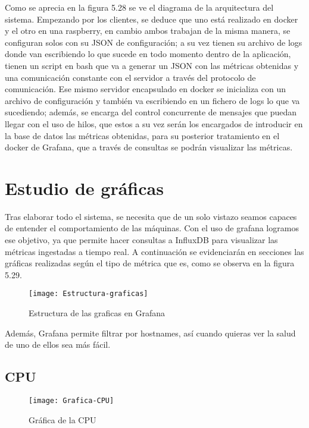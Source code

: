 \documentclass[ spanish, a4paper, 12pt, oneside]{report}
\begin{document}
Como se aprecia en la figura 5.28 se ve el diagrama de la arquitectura del sistema. Empezando por los clientes, se deduce que uno está realizado en docker y el otro en una raspberry, en cambio ambos trabajan de la misma manera, se configuran solos con su JSON de configuración; a su vez tienen su archivo de logs donde van escribiendo lo que 
sucede en todo momento dentro de la aplicación, tienen un script en bash que va a generar un JSON con las métricas obtenidas y una comunicación constante con el servidor a través del protocolo de comunicación. Ese mismo servidor encapsulado en docker se inicializa con un archivo de configuración y también va escribiendo en un fichero de logs lo que va sucediendo; además, 
se encarga del control concurrente de mensajes que puedan llegar con el uso de hilos, que estos a su vez serán los encargados de introducir en la base de datos las métricas obtenidas, para su posterior tratamiento en el docker de Grafana, que a través de consultas se podrán visualizar las métricas. \\
\newpage
\section{Estudio de gráficas}

Tras elaborar todo el sistema, se necesita que de un solo vistazo seamos capaces de entender el comportamiento de las máquinas. Con el uso de grafana logramos ese objetivo, ya que permite hacer consultas a InfluxDB para visualizar las métricas ingestadas a tiempo real. A continuación se evidenciarán en secciones 
las gráficas realizadas según el tipo de métrica que es, como se observa en la figura 5.29. \\ 

\begin{figure}[!h]
   \centering
   \texttt{[image: Estructura-graficas]}\\
      \caption{\label{fig: Estructura de las graficas en Grafana} Estructura de las graficas en Grafana}
\end{figure}

Además, Grafana permite filtrar por hostnames, así cuando quieras ver la salud de uno de ellos sea más fácil.\\
\subsection{CPU}

\begin{figure}[!h]
   \centering
   \texttt{[image: Grafica-CPU]}\\
      \caption{\label{fig: Gráfica de la CPU} Gráfica de la CPU}
\end{figure}
\end{document}
